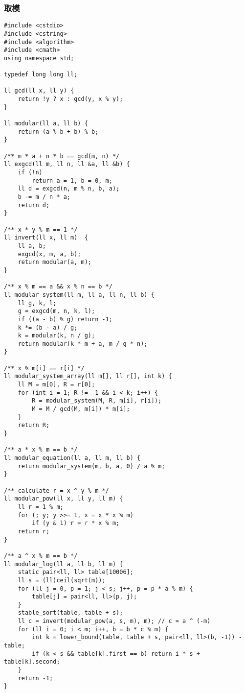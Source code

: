 \subsubsection{取模}
\begin{verbatim}
#include <cstdio>
#include <cstring>
#include <algorithm>
#include <cmath>
using namespace std;

typedef long long ll;

ll gcd(ll x, ll y) { 
    return !y ? x : gcd(y, x % y);
}

ll modular(ll a, ll b) { 
    return (a % b + b) % b; 
}

/** m * a + n * b == gcd(m, n) */
ll exgcd(ll m, ll n, ll &a, ll &b) { 
    if (!n)
        return a = 1, b = 0, m;
    ll d = exgcd(n, m % n, b, a);
    b -= m / n * a;
    return d;
}

/** x * y % m == 1 */
ll invert(ll x, ll m)  { 
    ll a, b;
    exgcd(x, m, a, b);
    return modular(a, m);
}

/** x % m == a && x % n == b */
ll modular_system(ll m, ll a, ll n, ll b) { 
    ll g, k, l;
    g = exgcd(m, n, k, l);
    if ((a - b) % g) return -1;
    k *= (b - a) / g;
    k = modular(k, n / g);
    return modular(k * m + a, m / g * n);
}

/** x % m[i] == r[i] */
ll modular_system_array(ll m[], ll r[], int k) {
    ll M = m[0], R = r[0];
    for (int i = 1; R != -1 && i < k; i++) {
        R = modular_system(M, R, m[i], r[i]);
        M = M / gcd(M, m[i]) * m[i];
    }
    return R;
}

/** a * x % m == b */
ll modular_equation(ll a, ll m, ll b) { 
    return modular_system(m, b, a, 0) / a % m;
}

/** calculate r = x ^ y % m */
ll modular_pow(ll x, ll y, ll m) {
    ll r = 1 % m;
    for (; y; y >>= 1, x = x * x % m)
        if (y & 1) r = r * x % m;
    return r;
}

/** a ^ x % m == b */
ll modular_log(ll a, ll b, ll m) {
    static pair<ll, ll> table[10006];
    ll s = (ll)ceil(sqrt(m));
    for (ll j = 0, p = 1; j < s; j++, p = p * a % m) {
        table[j] = pair<ll, ll>(p, j);
    }
    stable_sort(table, table + s);
    ll c = invert(modular_pow(a, s, m), m); // c = a ^ (-m)
    for (ll i = 0; i < m; i++, b = b * c % m) {
        int k = lower_bound(table, table + s, pair<ll, ll>(b, -1)) - table;
        if (k < s && table[k].first == b) return i * s + table[k].second;
    }
    return -1;
}
\end{verbatim}
